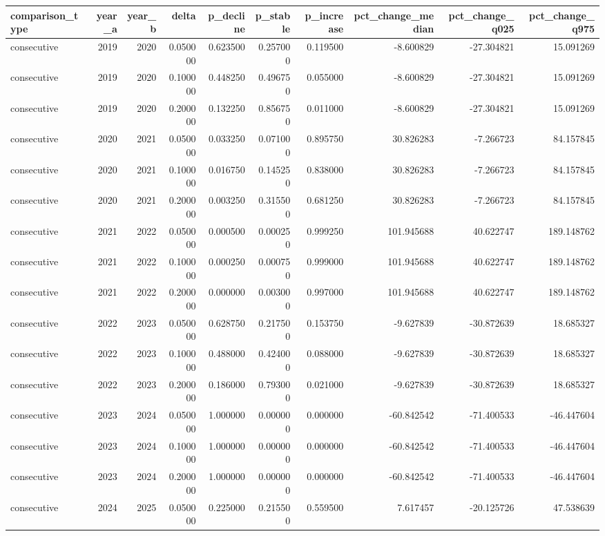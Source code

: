 \begin{tabular}{lrrrrrrrrr}
\toprule
comparison\_type & year\_a & year\_b & delta & p\_decline & p\_stable & p\_increase & pct\_change\_median & pct\_change\_q025 & pct\_change\_q975 \\
\midrule
consecutive & 2019 & 2020 & 0.050000 & 0.623500 & 0.257000 & 0.119500 & -8.600829 & -27.304821 & 15.091269 \\
consecutive & 2019 & 2020 & 0.100000 & 0.448250 & 0.496750 & 0.055000 & -8.600829 & -27.304821 & 15.091269 \\
consecutive & 2019 & 2020 & 0.200000 & 0.132250 & 0.856750 & 0.011000 & -8.600829 & -27.304821 & 15.091269 \\
consecutive & 2020 & 2021 & 0.050000 & 0.033250 & 0.071000 & 0.895750 & 30.826283 & -7.266723 & 84.157845 \\
consecutive & 2020 & 2021 & 0.100000 & 0.016750 & 0.145250 & 0.838000 & 30.826283 & -7.266723 & 84.157845 \\
consecutive & 2020 & 2021 & 0.200000 & 0.003250 & 0.315500 & 0.681250 & 30.826283 & -7.266723 & 84.157845 \\
consecutive & 2021 & 2022 & 0.050000 & 0.000500 & 0.000250 & 0.999250 & 101.945688 & 40.622747 & 189.148762 \\
consecutive & 2021 & 2022 & 0.100000 & 0.000250 & 0.000750 & 0.999000 & 101.945688 & 40.622747 & 189.148762 \\
consecutive & 2021 & 2022 & 0.200000 & 0.000000 & 0.003000 & 0.997000 & 101.945688 & 40.622747 & 189.148762 \\
consecutive & 2022 & 2023 & 0.050000 & 0.628750 & 0.217500 & 0.153750 & -9.627839 & -30.872639 & 18.685327 \\
consecutive & 2022 & 2023 & 0.100000 & 0.488000 & 0.424000 & 0.088000 & -9.627839 & -30.872639 & 18.685327 \\
consecutive & 2022 & 2023 & 0.200000 & 0.186000 & 0.793000 & 0.021000 & -9.627839 & -30.872639 & 18.685327 \\
consecutive & 2023 & 2024 & 0.050000 & 1.000000 & 0.000000 & 0.000000 & -60.842542 & -71.400533 & -46.447604 \\
consecutive & 2023 & 2024 & 0.100000 & 1.000000 & 0.000000 & 0.000000 & -60.842542 & -71.400533 & -46.447604 \\
consecutive & 2023 & 2024 & 0.200000 & 1.000000 & 0.000000 & 0.000000 & -60.842542 & -71.400533 & -46.447604 \\
consecutive & 2024 & 2025 & 0.050000 & 0.225000 & 0.215500 & 0.559500 & 7.617457 & -20.125726 & 47.538639 \\

\end{tabular}
